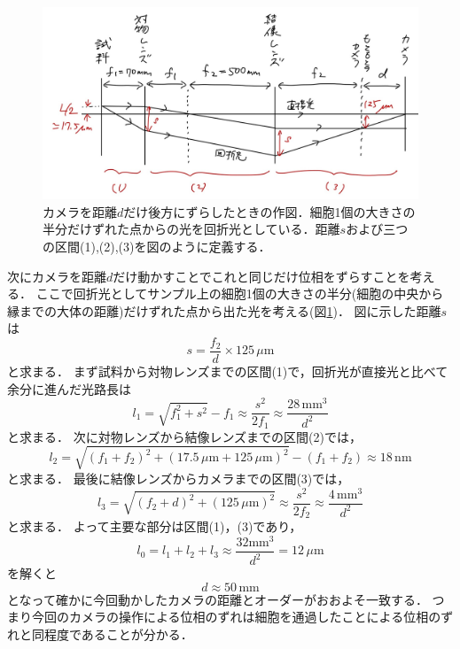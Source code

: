 \documentclass[titlepage]{jsarticle}
\begin{document}
\begin{figure}[htbp]
    \centering
    \includegraphics[width=14cm]{objphase.jpg}
    \caption{カメラを距離$d$だけ後方にずらしたときの作図．細胞1個の大きさの半分だけずれた点からの光を回折光としている．距離$s$および三つの区間(1),(2),(3)を図のように定義する．}
    \label{fig:objphase}
\end{figure}

次にカメラを距離$d$だけ動かすことでこれと同じだけ位相をずらすことを考える．
ここで回折光としてサンプル上の細胞1個の大きさの半分(細胞の中央から縁までの大体の距離)だけずれた点から出た光を考える(図\ref{fig:objphase})．
図に示した距離$s$は
\begin{equation}
    s = \frac{f_2}{d}\times 125\,\mu\mathrm{m}
\end{equation}
と求まる．
まず試料から対物レンズまでの区間(1)で，回折光が直接光と比べて余分に進んだ光路長は
\begin{equation}
    l_1 = \sqrt{f_1^2 + s^2} - f_1 \approx \frac{s^2}{2f_1} \approx \frac{28\,\mathrm{mm}^3}{d^2}
\end{equation}
と求まる．
次に対物レンズから結像レンズまでの区間(2)では，
\begin{equation}
    l_2 = \sqrt{(f_1+f_2)^2 + (17.5\,\mu\mathrm{m}+125\,\mu\mathrm{m})^2} - (f_1 + f_2) \approx 18\,\mathrm{nm}
\end{equation}
と求まる．
最後に結像レンズからカメラまでの区間(3)では，
\begin{equation}
    l_3 = \sqrt{(f_2+d)^2 + (125\,\mu\mathrm{m})^2} \approx \frac{s^2}{2f_2} \approx \frac{4\,\mathrm{mm}^3}{d^2}
\end{equation}
と求まる．
よって主要な部分は区間(1)，(3)であり，
\begin{equation}
    l_0 = l_1 + l_2 + l_3 \approx \frac{32\mathrm{mm}^3}{d^2} = 12\,\mu\mathrm{m}
\end{equation}
を解くと
\begin{equation}
    d \approx 50\,\mathrm{mm}
\end{equation}
となって確かに今回動かしたカメラの距離とオーダーがおおよそ一致する．
つまり今回のカメラの操作による位相のずれは細胞を通過したことによる位相のずれと同程度であることが分かる．
\end{document}
